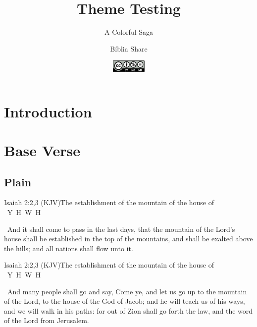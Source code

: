 \documentclass[12pt,aspectratio=169]{beamer}
\title{Theme Testing}
\subtitle{A Colorful Saga}
\author{Bíblia Share}
\date[{\tiny\tt https://github.com/bibliashare}]{{\scriptsize\tt%
    \includegraphics[height=6.0mm]{res/cc/by-nc-nd-88x31.pdf}%
}}
\newcommand{\YA}{%
    \mbox{%
        Y\makebox[0pt][l]{\hspace{-0.178em}\raisebox{-0.00ex}{\scalebox{0.30}{E}}}%
        H\makebox[0pt][l]{\hspace{-0.010em}\raisebox{-0.00ex}{\scalebox{0.30}{O}}}%
        W\makebox[0pt][l]{\hspace{-0.245em}\raisebox{-0.00ex}{\scalebox{0.30}{A}}}%
        H%
    }%
}
\newcommand{\ver}[1]{%
    \raisebox{0.50ex}{%
        \scalebox{1.1}{%
            \pmb{\textbf{\textcolor{BSpbg}{#1}}}%
        }%
    }%
}
\newcommand{\QUOTE}[1]{%
    \par\noindent\hspace*{0.1\linewidth}%
    \begin{minipage}{0.8\linewidth}%
        \linespread{1.35}\large{#1}%
    \end{minipage}%
}
\begin{document}
    \begin{frame}
        \titlepage
    \end{frame}
    \section{Introduction}
    \section{Base Verse}
    \subsection{Plain}

    \begin{frame}{Isaiah 2:2,3 (KJV)}{The establishment of the mountain of the house of \YA}
        \QUOTE{%
            \ver{2}~And it shall come to pass in the last days, that the mountain of the
            Lord's house shall be established in the top of the mountains, and shall  be
            exalted above the hills; and all nations shall flow unto it.
        }
    \end{frame}

    \begin{frame}{Isaiah 2:2,3 (KJV)}{The establishment of the mountain of the house of \YA}
        \QUOTE{%
            \ver{3}~And many people shall go and say, Come ye, and let us go up  to  the
            mountain of the Lord, to the house of the God of Jacob; and he will teach us
            of his ways, and we will walk in his paths: for out of Zion shall  go  forth
            the law, and the word of the Lord from Jerusalem.
        }
    \end{frame}
\end{document}
